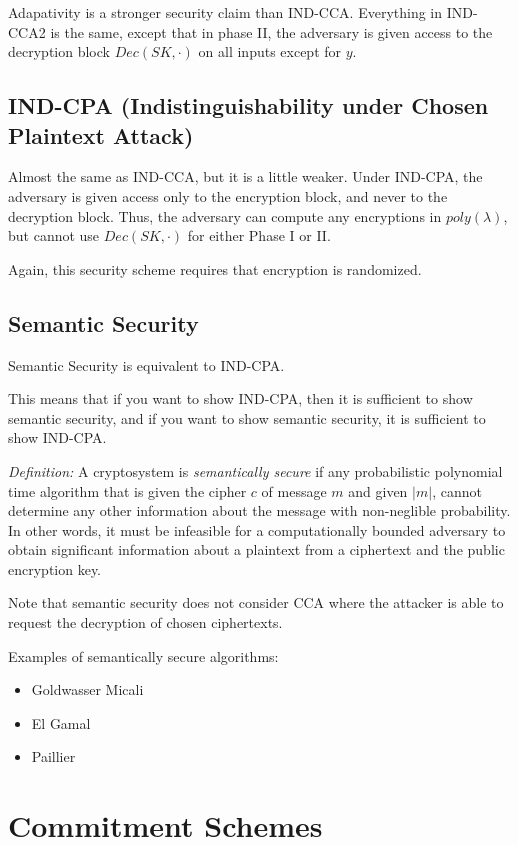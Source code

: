\documentclass[psamsfonts]{amsart}
\begin{document}
Adapativity is a stronger security claim than IND-CCA. Everything in IND-CCA2 is the same, except that in phase II, the adversary is given access to the decryption block $Dec(SK, \cdot)$ on all inputs except for $y$.

\subsection{IND-CPA (Indistinguishability under Chosen Plaintext Attack)}

Almost the same as IND-CCA, but it is a little weaker. Under IND-CPA, the adversary is given access only to the encryption block, and never to the decryption block. Thus, the adversary can compute any encryptions in $poly(\lambda)$, but cannot use $Dec(SK, \cdot)$ for either Phase I or II.

Again, this security scheme requires that encryption is randomized.

\subsection{Semantic Security}

Semantic Security is equivalent to IND-CPA.

This means that if you want to show IND-CPA, then it is sufficient to show semantic security, and if you want to show semantic security, it is sufficient to show IND-CPA.

\emph{Definition:} A cryptosystem is \emph{semantically secure} if any probabilistic polynomial time algorithm that is given the cipher $c$ of message $m$ and given $|m|$, cannot determine any other information about the message with non-neglible probability. In other words, it must be infeasible for a computationally bounded adversary to obtain significant information about a plaintext from a ciphertext and the public encryption key.

Note that semantic security does not consider CCA where the attacker is able to request the decryption of chosen ciphertexts.

Examples of semantically secure algorithms:
\begin{itemize}
  \item Goldwasser Micali
  \item El Gamal
  \item Paillier
\end{itemize}

\newpage

\section{Commitment Schemes}
\end{document}
